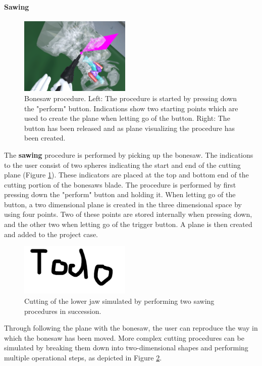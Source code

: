 \paragraph{Sawing}

\begin{figure}[ht]
    \centering
    \includegraphics[width=200px]{images/implementation/features/procedures/bonesaw.png}
    \caption{\label{fig::FeatureBoneSaw}Bonesaw procedure. Left: The procedure is started by pressing down the "perform" button. Indications show two starting points which are used to create the plane when letting go of the button. Right: The button has been released and as plane visualizing the procedure has been created.}
\end{figure}

The \textbf{sawing} procedure is performed by picking up the bonesaw.
The indications to the user consist of two spheres indicating the start and end of the cutting plane (Figure \ref{fig::FeatureBoneSaw}).
These indicators are placed at the top and bottom end of the cutting portion of the bonesaws blade.
The procedure is performed by first pressing down the "perform" button and holding it.
When letting go of the button, a two dimensional plane is created in the three dimensional space by using four points.
Two of these points are stored internally when pressing down, and the other two when letting go of the trigger button.
A plane is then created and added to the project case.

\begin{figure}[ht]
    \centering
    \includegraphics[width=200px]{images/todo.png}
    \caption{\label{fig::MultipleSawing}Cutting of the lower jaw simulated by performing two sawing procedures in succession.}
\end{figure}

Through following the plane with the bonesaw, the user can reproduce the way in which the bonesaw has been moved.
More complex cutting procedures can be simulated by breaking them down into two-dimensional shapes and performing multiple operational steps, as depicted in Figure \ref{fig::MultipleSawing}.